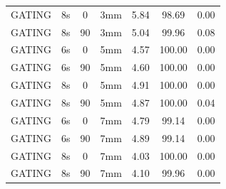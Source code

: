 \documentclass[type=dr, dr=rernat, accentcolor=tud7b,colorbacktitle, bigchapter, openright, twoside, 12pt ]{tudthesis}
\begin{document}
\begin{table}[H]
\begin{tabular}{|c||c|c|c||c|c|c|}
GATING & 8s & 0 & 3mm & 5.84 & 98.69 & 0.00 \\
GATING & 8s & 90 & 3mm & 5.04 & 99.96 & 0.08 \\
GATING & 6s & 0 & 5mm & 4.57 & 100.00 & 0.00 \\
GATING & 6s & 90 & 5mm & 4.60 & 100.00 & 0.00 \\
GATING & 8s & 0 & 5mm & 4.91 & 100.00 & 0.00 \\
GATING & 8s & 90 & 5mm & 4.87 & 100.00 & 0.04 \\
GATING & 6s & 0 & 7mm & 4.79 & 99.14 & 0.00 \\
GATING & 6s & 90 & 7mm & 4.89 & 99.14 & 0.00 \\
GATING & 8s & 0 & 7mm & 4.03 & 100.00 & 0.00 \\
GATING & 8s & 90 & 7mm & 4.10 & 99.96 & 0.00 \\
    \hline\hline 
  \end{tabular}
\end{table}


\newpage
\end{document}
